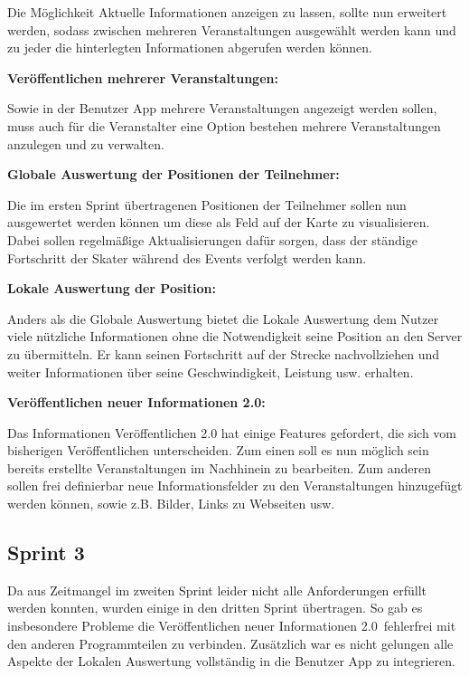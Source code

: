 \documentclass[a4paper, titlepage]{scrartcl}
\begin{document}
Die Möglichkeit Aktuelle Informationen anzeigen zu lassen, sollte nun erweitert werden, sodass zwischen mehreren Veranstaltungen ausgewählt werden kann und zu jeder die hinterlegten Informationen abgerufen werden können.

\textbf{Veröffentlichen mehrerer Veranstaltungen:}

Sowie in der Benutzer App mehrere Veranstaltungen angezeigt werden sollen, muss auch für die Veranstalter eine Option bestehen mehrere Veranstaltungen anzulegen und zu verwalten.

\textbf{Globale Auswertung der Positionen der Teilnehmer:}

Die im ersten Sprint übertragenen Positionen der Teilnehmer sollen nun ausgewertet werden können um diese als Feld auf der Karte zu visualisieren. Dabei sollen regelmäßige Aktualisierungen dafür sorgen, dass der ständige Fortschritt der Skater während des Events verfolgt werden kann.

\textbf{Lokale Auswertung der Position:}

Anders als die Globale Auswertung bietet die Lokale Auswertung dem Nutzer viele nützliche Informationen ohne die Notwendigkeit seine Position an den Server zu übermitteln. Er kann seinen Fortschritt auf der Strecke nachvollziehen und weiter Informationen über seine Geschwindigkeit, Leistung usw. erhalten.

\textbf{Veröffentlichen neuer Informationen 2.0:}

Das Informationen Veröffentlichen 2.0 hat einige Features gefordert, die sich vom bisherigen Veröffentlichen unterscheiden. Zum einen soll es nun möglich sein bereits erstellte Veranstaltungen im Nachhinein zu bearbeiten. Zum anderen sollen frei definierbar neue Informationsfelder zu den Veranstaltungen hinzugefügt werden können, sowie z.B. Bilder, Links zu Webseiten usw.



\subsection{Sprint 3}
Da aus Zeitmangel im zweiten Sprint leider nicht alle Anforderungen erfüllt werden konnten, wurden einige in den dritten Sprint übertragen. So gab es insbesondere Probleme die \glqq Veröffentlichen neuer Informationen 2.0\grqq\ fehlerfrei mit den anderen Programmteilen zu verbinden. Zusätzlich war es nicht gelungen alle Aspekte der Lokalen Auswertung vollständig in die Benutzer App zu integrieren.
\end{document}

